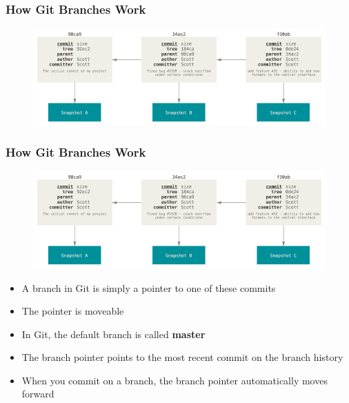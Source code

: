 \documentclass{beamer}
\begin{document}
\begin{frame}
	\frametitle{How Git Branches Work}
	\begin{figure}
		\includegraphics[scale=0.40]{How_Git_Branches_Work-0.png}
	\end{figure}
\end{frame}

\begin{frame}
	\frametitle{How Git Branches Work}
	\begin{figure}
		\includegraphics[scale=0.30]{How_Git_Branches_Work-0.png}
	\end{figure}
	\begin{itemize}
		\item{A branch in Git is simply a pointer to one of these commits}
		\item{The pointer is moveable}
		\item{In Git, the default branch is called \textbf{master}}
		\item{The branch pointer points to the most recent commit on the branch history}
		\item{When you commit on a branch, the branch pointer automatically moves forward}
	\end{itemize}
\end{frame}
\end{document}
